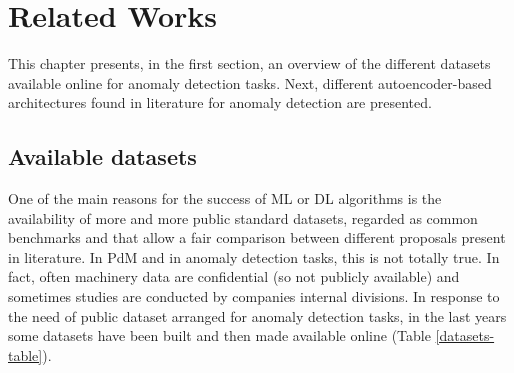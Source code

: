 \chapter{Related Works}

This chapter presents, in the first section, an overview of the different datasets available online for anomaly detection tasks. Next, different autoencoder-based architectures found in literature for anomaly detection are presented.

\section{Available datasets}
One of the main reasons for the success of ML or DL algorithms is the availability of more and more public standard datasets, regarded as common benchmarks and that allow a fair comparison between different proposals present in literature. In PdM and in anomaly detection tasks, this is not totally true. In fact, often machinery data are confidential (so not publicly available) and sometimes studies are conducted by companies internal divisions. In response to the need of public dataset arranged for anomaly detection tasks, in the last years some datasets have been built and then made available online (Table \ref{datasets-table}).\\

